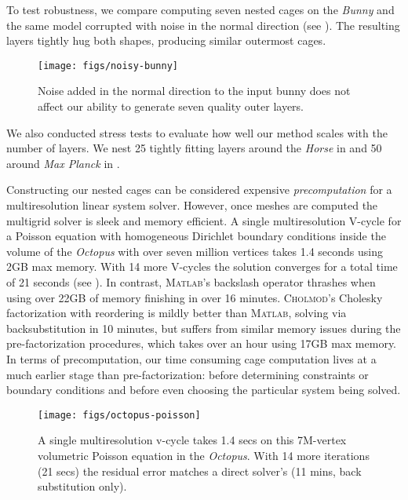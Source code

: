 To test robustness, we compare computing seven nested cages on the \emph{Bunny}
and the same model corrupted with noise in the normal direction (see
). The resulting layers tightly hug both shapes, producing
similar outermost cages.

\begin{figure}
  \texttt{[image: figs/noisy-bunny]}
  \caption{Noise added in the normal direction to the input bunny does not
  affect our ability to generate seven quality outer layers.}
  \label{fig:noisy-bunny}
\end{figure}

We also conducted stress tests to evaluate how well our method scales with the
number of layers. We nest 25 tightly fitting layers around the \emph{Horse} in
 and 50 around \emph{Max Planck} in .

%
Constructing our nested cages can be considered expensive \emph{precomputation}
for a multiresolution linear system solver.
%
However, once meshes are computed the multigrid solver is sleek and memory
efficient.
%
A single multiresolution V-cycle for a Poisson equation with homogeneous
Dirichlet boundary conditions inside the volume of the \emph{Octopus} with over
seven million vertices takes 1.4 seconds using 2GB max memory. With 14 more
V-cycles the solution converges for a total time of 21 seconds (see
).
%
In contrast, \textsc{Matlab}'s backslash operator thrashes when using over 22GB
of memory finishing in over 16 minutes.
%
\textsc{Cholmod}'s Cholesky factorization with reordering is mildly better than
\textsc{Matlab}, solving via backsubstitution in 10 minutes, but suffers from
similar memory issues during the pre-factorization procedures, which takes over
an hour using 17GB max memory.
%
In terms of precomputation, our time consuming cage computation lives at a much
earlier stage than pre-factorization: before determining constraints or
boundary conditions and before even choosing the particular system being
solved.


\begin{figure}
  \texttt{[image: figs/octopus-poisson]}
  \caption{A single multiresolution v-cycle takes 1.4 secs on this 7M-vertex
  volumetric Poisson equation in the \emph{Octopus}. With 14 more iterations
  (21 secs) the residual error matches a direct solver's (11 mins, back
  substitution only).}
  \label{fig:octopus-poisson}
\end{figure}


